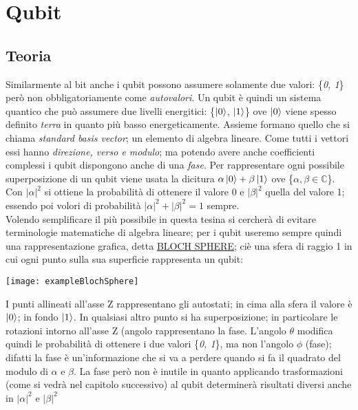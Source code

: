 \section{Qubit}
\subsection{Teoria}
Similarmente al bit anche i qubit possono assumere solamente due valori: \{\textit{0, 1}\} però non obbligatoriamente come \textit{autovalori}.
Un qubit è quindi un sistema quantico che può assumere due livelli energitici: \{$\ket{0}$, $\ket{1}$\} ove $\ket{0}$ viene spesso definito \textit{terra} in quanto più basso energeticamente.  Assieme formano quello che si chiama \textit{standard basis vector}; un elemento di algebra lineare. Come tutti i vettori essi hanno \textit{direzione, verso e modulo}; ma potendo avere anche coefficienti complessi i qubit dispongono anche di una \textit{fase}. Per rappresentare ogni possibile superposizione di un qubit viene usata la dicitura $\alpha\ket{0} + \beta\ket{1}$ ove \{$\alpha,\beta \in \mathbb{C}$\}. Con $|\alpha|^2$ si ottiene la probabilità di ottenere il valore 0 e $|\beta|^2$ quella del valore 1; essendo poi volori di probabilità $|\alpha|^2 + |\beta|^2 = 1$ sempre.\\
Volendo semplificare il più possibile in questa tesina si cercherà di evitare terminologie matematiche di algebra lineare; per i qubit useremo sempre quindi una rappresentazione grafica, detta \underline{BLOCH SPHERE}; ciè una sfera di raggio 1 in cui ogni punto sulla sua superficie rappresenta un qubit:\\
\begin{center}
\texttt{[image: exampleBlochSphere]}
\end{center}
I punti allineati all'asse Z rappresentano gli autostati; in cima alla sfera il valore è $\ket{0}$; in fondo $\ket{1}$. In qualsiasi altro punto si ha superposizione; in particolare le rotazioni intorno all'asse Z (angolo rappresentano la fase. L'angolo $\theta$ modifica quindi le probabilità di ottenere i due valori \{\textit{0, 1}\}, ma non l'angolo $\phi$ (fase); difatti la fase è un'informazione che si va a perdere quando si fa il quadrato del modulo di $\alpha$ e $\beta$. La fase però non è inutile in quanto applicando trasformazioni (come si vedrà nel capitolo successivo) al qubit determinerà risultati diversi anche in $|\alpha|^2$ e $|\beta|^2$
